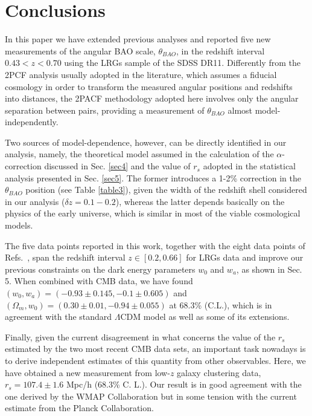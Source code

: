 \documentclass[a4paper,11pt]{article}
\begin{document}
\section{Conclusions} 
\label{sec6}

In this paper we have extended previous analyses \cite{Carvalho,Alcaniz} and reported five new measurements of the angular BAO scale, $\theta_{BAO}$, in the redshift interval $0.43 < z < 0.70$ using the LRGs sample of the SDSS DR11. Differently from  the 2PCF analysis usually adopted in the literature, which assumes a fiducial cosmology in order  to transform the measured angular positions and redshifts into distances, the 2PACF methodology adopted here involves only the angular separation between pairs, providing a measurement of $\theta_{BAO}$ almost model-independently. 

Two sources of model-dependence, however, can be directly identified in our analysis, namely, the theoretical model assumed in the calculation of the $\alpha$-correction discussed in Sec. \ref{sec4} and the value of $r_s$ adopted in the statistical analysis presented in Sec. \ref{sec5}. The former introduces a 1-2\% correction in the $\theta_{BAO}$ position (see Table \ref{table3}), given the width of the redshift shell considered in our analysis ($\delta z = 0.1 -0.2$), whereas the latter depends basically on the physics of the early universe, which is similar in most of the viable cosmological models.  


The five data points reported in this work, together with the eight data points of Refs.~\cite{Carvalho,Alcaniz}, span the redshift interval $z \in [0.2,0.66]$ for LRGs data and improve our previous constraints on the dark energy parameters $w_0$ and $w_a$, as shown in Sec. 5. When combined with CMB data, we have found $(w_0, w_a) = (-0.93 \pm 0.145, -0.1 \pm 0.605)$ and $(\Omega_m, w_0) = (0.30 \pm 0.01, -0.94 \pm 0.055)$ at 68.3\% (C.L.), which is in agreement with the standard $\Lambda$CDM model as well as some of its extensions. 

Finally, given the current disagreement in what concerns the value of the $r_s$ estimated by the two most recent CMB data sets, an important task nowadays is to derive independent estimates of this quantity from other observables.  Here, we have obtained a new measurement from low-$z$  galaxy clustering data, $r_s =  107.4 \pm 1.6 $ Mpc/h (68.3\% C. L.). Our result is in good agreement with the one derived by the WMAP Collaboration but in some tension with the current estimate from the Planck Collaboration.
\end{document}
